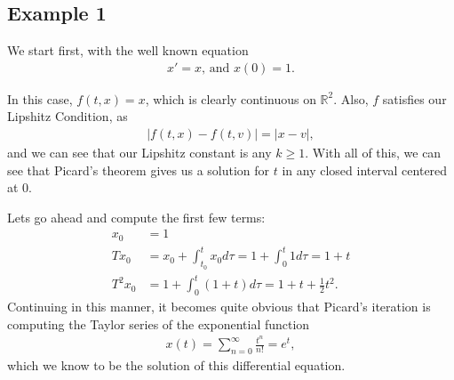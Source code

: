 \documentclass[10pt,a4paper]{article}
\theoremstyle{theorem}
\theoremstyle{definition}
\begin{document}
\subsection*{Example 1}
We start first, with the well known equation
\begin{align*}
x' = x \text{,  and } x(0) = 1.
\end{align*}

In this case, $f(t, x) = x$, which is clearly continuous on $\mathbb{R}^2$.  Also, $f$ satisfies our Lipshitz Condition, as
\begin{align*}
|f(t, x) - f(t, v)| = |x - v|,
\end{align*}
and we can see that our Lipshitz constant is any $k \geq 1$. With all of this, we can see that Picard's theorem gives us a solution for $t$ in any closed interval centered at $0$.

Lets go ahead and compute the first few terms:
\begin{align*}
x_0 &= 1\\
Tx_0 &= x_0 + \int_{t_0}^{t} x_0 d \tau = 1 +  \int_{0}^{t} 1 d \tau = 1 + t\\
T^{2} x_0 &= 1 +  \int_{0}^{t} (1 + t) d \tau = 1 + t + \frac{1}{2}t^2 .
\end{align*}
Continuing in this manner, it becomes quite obvious that Picard's iteration is computing the Taylor series of the exponential function
\begin{align*}
x(t) = \sum_{n = 0}^\infty \frac{t^n}{n !} = e^t,
\end{align*}
which we know to be the solution of this differential equation.
\end{document}
